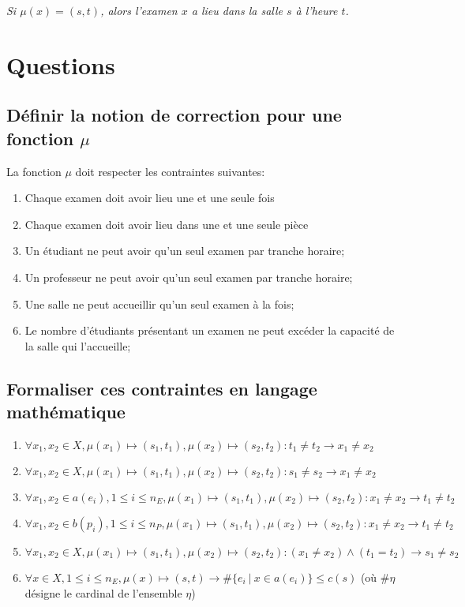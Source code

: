 \documentclass[a4paper]{article}
\begin{document}
\textit{Si $\mu(x) = (s,t)$, alors l'examen $x$ a lieu dans la salle $s$ à l'heure $t$.}

\section{Questions}
\subsection{Définir la notion de correction pour une fonction $\mu$}
La fonction $\mu$ doit respecter les contraintes suivantes:
\begin{enumerate}
  \item Chaque examen doit avoir lieu une et une seule fois
  \item Chaque examen doit avoir lieu dans une et une seule pièce
  \item Un étudiant ne peut avoir qu'un seul examen par tranche horaire;
  \item Un professeur ne peut avoir qu'un seul examen par tranche horaire;
  \item Une salle ne peut accueillir qu'un seul examen à la fois;
  \item Le nombre d'étudiants présentant un examen ne peut excéder la capacité de la salle qui l'accueille;
\end{enumerate}

\subsection{Formaliser ces contraintes en langage mathématique}
\begin{enumerate}
  \item $\forall x_1,x_2 \in X, \mu(x_1) \mapsto (s_1,t_1), \mu(x_2) \mapsto (s_2,t_2): t_1 \neq t_2 \rightarrow x_1 \neq x_2 $
  \item $\forall x_1,x_2 \in X, \mu(x_1) \mapsto (s_1,t_1), \mu(x_2) \mapsto (s_2,t_2): s_1 \neq s_2 \rightarrow x_1 \neq x_2 $
  \item $\forall x_1,x_2 \in a(e_i), 1 \le i \le n_E, \mu(x_1) \mapsto (s_1,t_1), \mu(x_2) \mapsto (s_2,t_2): x_1 \neq x_2 \rightarrow t_1 \neq t_2 $
  \item $\forall x_1,x_2 \in b(p_i), 1 \le i \le n_P, \mu(x_1) \mapsto (s_1,t_1), \mu(x_2) \mapsto (s_2,t_2): x_1 \neq x_2 \rightarrow t_1 \neq t_2 $
  \item $\forall x_1,x_2 \in X, \mu(x_1) \mapsto (s_1,t_1), \mu(x_2) \mapsto (s_2,t_2): (x_1 \neq x_2) \land (t_1 = t_2) \rightarrow s_1 \neq s_2 $
  \item $\forall x \in X, 1 \le i \le n_E, \mu(x) \mapsto (s,t) \rightarrow \#\{e_i\ |\ x \in a(e_i)\} \le c(s)$ (où $\#\eta$ désigne le cardinal de l'ensemble $\eta$)
\end{enumerate}
\end{document}
